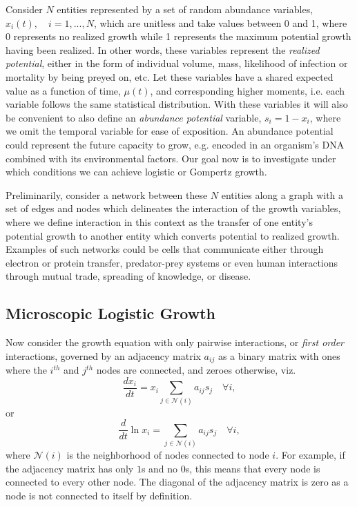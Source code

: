 \documentclass{article}
\begin{document}
Consider $N$ entities represented by a set of random abundance variables, $x_i(t), \quad i=1, ..., N$, which are unitless and take values between 0 and 1, where 0 represents no realized growth while 1 represents the maximum potential growth having been realized. In other words, these variables represent the \textit{realized potential}, either in the form of individual volume, mass, likelihood of infection or mortality by being preyed on, etc. 
Let these variables have a shared expected value as a function of time, $\mu(t)$, and corresponding higher moments, i.e. each variable follows the same statistical distribution.
With these variables it will also be convenient to also define an \textit{abundance potential} variable, $s_i = 1 - x_i$, where we omit the temporal variable for ease of exposition. An abundance potential could represent the future capacity to grow, e.g. encoded in an organism's DNA combined with its environmental factors. Our goal now is to investigate under which conditions we can achieve logistic or Gompertz growth.

Preliminarily, consider a network between these $N$ entities along a graph with a set of edges and nodes which delineates the interaction of the growth variables, where we define interaction in this context as the transfer of one entity's potential growth to another entity which converts potential to realized growth. Examples of such networks could be cells that communicate either through electron or protein transfer, predator-prey systems or even human interactions through mutual trade, spreading of knowledge, or disease.

\subsection{Microscopic Logistic Growth}

Now consider the growth equation with only pairwise interactions, or \textit{first order} interactions, governed by an adjacency matrix ${a_{ij}}$ as a binary matrix with ones where the $i^{th}$ and $j^{th}$ nodes are connected, and zeroes otherwise, viz.
\begin{equation}
\label{eq:modSIR}
\frac{d x_i}{dt} = x_i\sum_{j \in \mathcal{N}(i)}{a_{ij}}s_{j} \quad \forall i,
\end{equation}
or
\begin{equation}
\label{eq:modSIR2}
\frac{d}{dt}\ln x_i = \sum_{j \in \mathcal{N}(i)}{a_{ij}}s_{j} \quad \forall i,
\end{equation}
where $\mathcal{N}(i)$ is the neighborhood of nodes connected to node $i$. For example, if the adjacency matrix has only $1$s and no $0$s, this means that every node is connected to every other node. The diagonal of the adjacency matrix is zero as a node is not connected to itself by definition.
\end{document}
